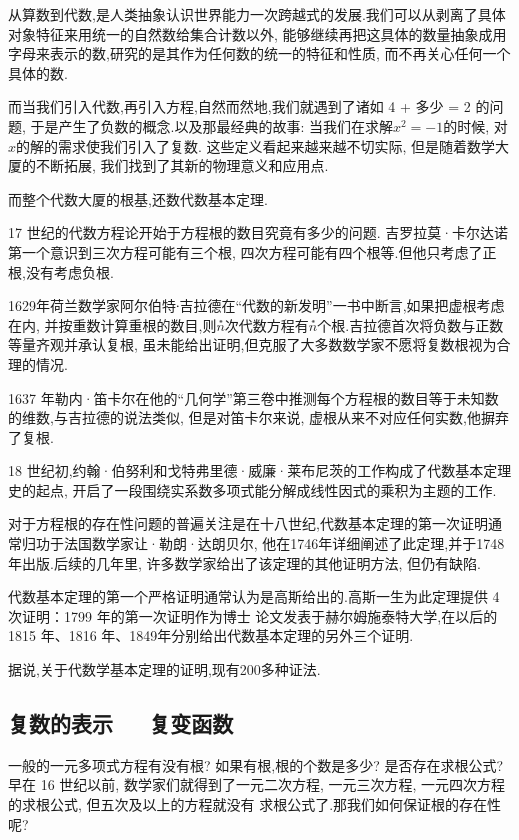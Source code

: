 \documentclass[12pt,a4paper]{ctexart}
\begin{document}
{\fangsong 从算数到代数,是人类抽象认识世界能力一次跨越式的发展.我们可以从剥离了具体对象特征来用统一的自然数给集合计数以外,
    能够继续再把这具体的数量抽象成用字母来表示的数,研究的是其作为任何数的统一的特征和性质,
    而不再关心任何一个具体的数.

    而当我们引入代数,再引入方程,自然而然地,我们就遇到了诸如 4 + 多少 = 2 的问题,
    于是产生了负数的概念.以及那最经典的故事: 当我们在求解$x^2 = -1$的时候,
    对$x$的解的需求使我们引入了复数. 这些定义看起来越来越不切实际,
    但是随着数学大厦的不断拓展, 我们找到了其新的物理意义和应用点.

    而整个代数大厦的根基,还数代数基本定理.

    17 世纪的代数方程论开始于方程根的数目究竟有多少的问题.
    吉罗拉莫·卡尔达诺第一个意识到三次方程可能有三个根,
    四次方程可能有四个根等.但他只考虑了正根,没有考虑负根.

    1629年荷兰数学家阿尔伯特∙吉拉德在“代数的新发明”一书中断言,如果把虚根考虑在内,
    并按重数计算重根的数目,则$݊n$次代数方程有$݊n$个根.吉拉德首次将负数与正数等量齐观并承认复根,
    虽未能给出证明,但克服了大多数数学家不愿将复数根视为合理的情况.

    1637 年勒内·笛卡尔在他的“几何学”第三卷中推测每个方程根的数目等于未知数的维数,与吉拉德的说法类似,
    但是对笛卡尔来说, 虚根从来不对应任何实数,他摒弃了复根.

    18 世纪初,约翰·伯努利和戈特弗里德·威廉·莱布尼茨的工作构成了代数基本定理史的起点,
    开启了一段围绕实系数多项式能分解成线性因式的乘积为主题的工作.

    对于方程根的存在性问题的普遍关注是在十八世纪,代数基本定理的第一次证明通常归功于法国数学家让·勒朗·达朗贝尔,
    他在1746年详细阐述了此定理,并于1748年出版.后续的几年里, 许多数学家给出了该定理的其他证明方法, 但仍有缺陷.

    代数基本定理的第一个严格证明通常认为是高斯给出的.高斯一生为此定理提供 4次证明：1799 年的第一次证明作为博士
    论文发表于赫尔姆施泰特大学,在以后的1815 年、1816 年、1849年分别给出代数基本定理的另外三个证明.

    据说,关于代数学基本定理的证明,现有200多种证法.

}
\fangsong
\subsection{复数的表示\ \ \ 复变函数}

一般的一元多项式方程有没有根? 如果有根,根的个数是多少? 是否存在求根公式? 早在 16 世纪以前,
数学家们就得到了一元二次方程, 一元三次方程, 一元四次方程的求根公式, 但五次及以上的方程就没有
求根公式了.那我们如何保证根的存在性呢?
\end{document}
